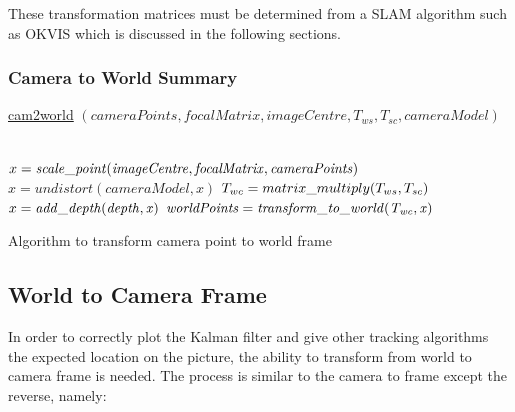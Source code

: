 \documentclass[11pt,twoside]{report}
\begin{document}
These transformation matrices must be determined from a SLAM algorithm such as OKVIS which is discussed in the following sections.
\subsubsection{Camera to World Summary}

\begin{algorithm}
	\DontPrintSemicolon
	\SetAlgoLined
	\underline{cam2world} $(cameraPoints,focalMatrix,imageCentre,T_{ws},T_{sc},cameraModel)$\;
	
	\texttt{\\}
	$x = \mathit{scale\text{\textunderscore}point(imageCentre,focalMatrix,cameraPoints)}$ 
	$x = \mathit{undistort(cameraModel,x)}$ 
	$T_{wc} = matrix\text{\textunderscore}multiply(T_{ws},T_{sc})$
	\texttt{\\}
	$x = \mathit{add\text{\textunderscore}depth(depth,x)}$ 
	$\mathit{worldPoints} = \mathit{transform\text{\textunderscore}to\text{\textunderscore}world(T_{wc},x)}$ 
	\texttt{\\}
	\caption{Algorithm to transform camera point to world frame}
	\label{alg:weights}
\end{algorithm}

\subsection{World to Camera Frame} \label{w_c_frame}

In order to correctly plot the Kalman filter and give other tracking algorithms the expected location on the picture, the ability to transform from world to camera frame is needed. The process is similar to the camera to frame except the reverse, namely:
\end{document}
